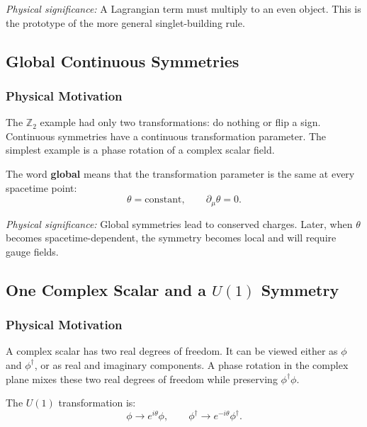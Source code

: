 \documentclass[../main.tex]{subfiles}
\begin{document}
\textit{Physical significance:} A Lagrangian term must multiply to an even object.  This is the prototype of the more general singlet-building rule.

\subsection*{Global Continuous Symmetries}

\subsubsection*{Physical Motivation}

The $\mathbb{Z}_2$ example had only two transformations: do nothing or flip a sign.  Continuous symmetries have a continuous transformation parameter.  The simplest example is a phase rotation of a complex scalar field.

The word \textbf{global} means that the transformation parameter is the same at every spacetime point:
\begin{equation}
  \boxed{
  \theta=\text{constant},
  \qquad
  \partial_\mu\theta=0.}
  \label{eq:lec09:global-parameter}
\end{equation}

\textit{Physical significance:} Global symmetries lead to conserved charges.  Later, when $\theta$ becomes spacetime-dependent, the symmetry becomes local and will require gauge fields.

\subsection*{One Complex Scalar and a $U(1)$ Symmetry}

\subsubsection*{Physical Motivation}

A complex scalar has two real degrees of freedom.  It can be viewed either as $\phi$ and $\phi^\dagger$, or as real and imaginary components.  A phase rotation in the complex plane mixes these two real degrees of freedom while preserving $\phi^\dagger\phi$.

The $U(1)$ transformation is:
\begin{equation}
  \boxed{
  \phi\longrightarrow e^{i\theta}\phi,
  \qquad
  \phi^\dagger\longrightarrow e^{-i\theta}\phi^\dagger.}
  \label{eq:lec09:u1-single-scalar}
\end{equation}
\end{document}
